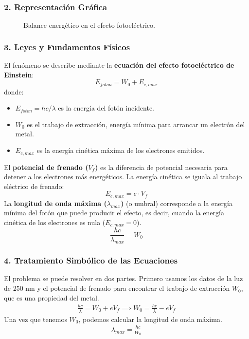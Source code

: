 \subsubsection*{2. Representación Gráfica}
\begin{figure}[H]
    \centering
    \caption{Balance energético en el efecto fotoeléctrico.}
\end{figure}

\subsubsection*{3. Leyes y Fundamentos Físicos}
El fenómeno se describe mediante la \textbf{ecuación del efecto fotoeléctrico de Einstein}:
$$ E_{foton} = W_0 + E_{c,max} $$
donde:
\begin{itemize}
    \item $E_{foton} = hc/\lambda$ es la energía del fotón incidente.
    \item $W_0$ es el trabajo de extracción, energía mínima para arrancar un electrón del metal.
    \item $E_{c,max}$ es la energía cinética máxima de los electrones emitidos.
\end{itemize}
El \textbf{potencial de frenado ($V_f$)} es la diferencia de potencial necesaria para detener a los electrones más energéticos. La energía cinética se iguala al trabajo eléctrico de frenado:
$$ E_{c,max} = e \cdot V_f $$
La \textbf{longitud de onda máxima ($\lambda_{max}$)} (o umbral) corresponde a la energía mínima del fotón que puede producir el efecto, es decir, cuando la energía cinética de los electrones es nula ($E_{c,max}=0$).
$$ \frac{hc}{\lambda_{max}} = W_0 $$

\subsubsection*{4. Tratamiento Simbólico de las Ecuaciones}
El problema se puede resolver en dos partes. Primero usamos los datos de la luz de 250 nm y el potencial de frenado para encontrar el trabajo de extracción $W_0$, que es una propiedad del metal.
\begin{gather}
    \frac{hc}{\lambda} = W_0 + e V_f \implies W_0 = \frac{hc}{\lambda} - e V_f
\end{gather}
Una vez que tenemos $W_0$, podemos calcular la longitud de onda máxima.
\begin{gather}
    \lambda_{max} = \frac{hc}{W_0}
\end{gather}

